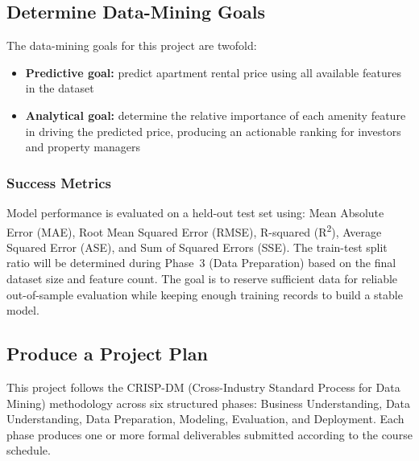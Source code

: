 \subsection{Determine Data-Mining Goals}
\noindent
The data-mining goals for this project are twofold:
\vspace{-12pt}
\begin{itemize}[itemsep=-9pt]
    \item \textbf{Predictive goal:} predict apartment rental price using all available features in the dataset
    \item \textbf{Analytical goal:} determine the relative importance of each amenity feature in driving the predicted price, producing an actionable ranking for investors and property managers
\end{itemize}


\medskip\noindent
\subsubsection*{Success Metrics}
\noindent
Model performance is evaluated on a held-out test set using: Mean Absolute Error (MAE), Root Mean Squared Error (RMSE), R-squared (R\textsuperscript{2}), Average Squared Error (ASE), and Sum of Squared Errors (SSE). The train-test split ratio will be determined during Phase~3 (Data Preparation) based on the final dataset size and feature count. The goal is to reserve sufficient data for reliable out-of-sample evaluation while keeping enough training records to build a stable model.

\subsection{Produce a Project Plan}
\noindent
This project follows the CRISP-DM (Cross-Industry Standard Process for Data Mining) methodology across six structured phases: Business Understanding, Data Understanding, Data Preparation, Modeling, Evaluation, and Deployment. Each phase produces one or more formal deliverables submitted according to the course schedule.


